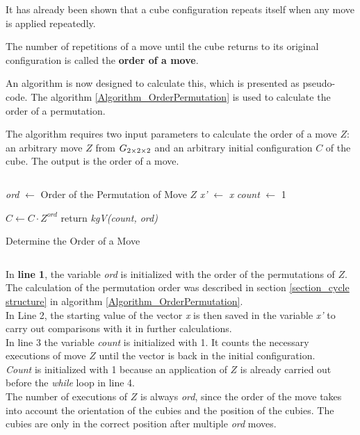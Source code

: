 It has already been shown that a cube configuration repeats itself when any move is applied repeatedly. 
\begin{definition}
    The number of repetitions of a move until the cube returns to its original configuration is called the \textbf{order of a move}.
\end{definition}
An algorithm is now designed to calculate this, which is presented as pseudo-code. The algorithm \ref{Algorithm_OrderPermutation} is used to calculate the order of a permutation.

The algorithm requires two input parameters to calculate the order of a move $Z$: an arbitrary move $Z$ from $G_{2\times 2\times 2}$ and an arbitrary initial configuration $C$ of the cube. The output is the order of a move.

\begin{minipage}[H]{0.15\textwidth}
      $\ $
\end{minipage}
\begin{minipage}[H]{0.65\textwidth}
\begin{algorithm}[H]
\LinesNumbered
\DontPrintSemicolon
{}

 \textit{ord} $\leftarrow$ Order of the Permutation of Move $Z$\;
  \textit{x'} $\leftarrow$ \textit{x}\;
  \textit{count} $\leftarrow$ 1\;

  $C \leftarrow C \cdot  Z^\textit{ord}$ \; 
 return \textit{kgV(count, ord)} \;

\caption{Determine the Order of a Move} 
\label{Algorithm_OrderMove}
\end{algorithm}
\end{minipage}
\begin{minipage}[H]{0.2\textwidth}
      $\ $
\end{minipage}

\vspace*{1em}


In \textbf{line 1}, the variable \textit{ord} is initialized with the order of the permutations of $Z$. 
The calculation of the permutation order was described in section \ref{section_cycle structure} in algorithm \ref{Algorithm_OrderPermutation}. \\
In Line 2, the starting value of the vector \textit{x} is then saved in the variable \textit{x'} to carry out comparisons with it in further calculations. \\
In line 3 the variable \textit{count} is initialized with 1. It counts the necessary executions of move $Z$ until the vector is back in the initial configuration. \\ \textit{Count} is initialized with 1 because an application of $Z$ is already carried out before the \textit{while} loop in line 4. 
\\ 
The number of executions of $Z$ is always \textit{ord}, since the order of the move takes into account the orientation of the cubies and the position of the cubies. The cubies are only in the correct position after multiple \textit{ord} moves.

